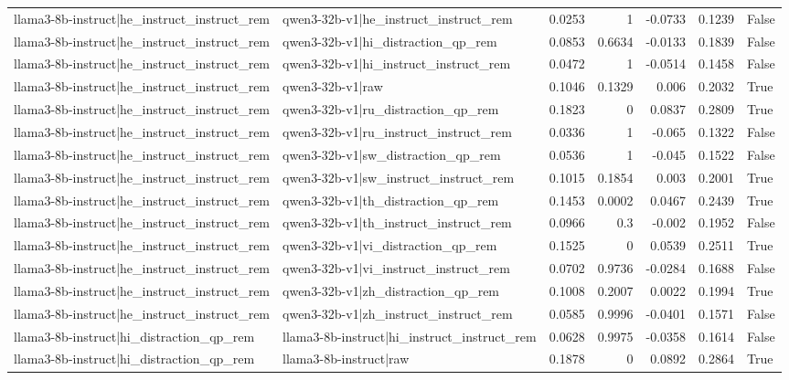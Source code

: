 \begin{table}
\begin{tabular}{l l r r r r l}
llama3-8b-instruct|he_instruct_instruct_rem & qwen3-32b-v1|he_instruct_instruct_rem & 0.0253 & 1 & -0.0733 & 0.1239 & False \\
llama3-8b-instruct|he_instruct_instruct_rem & qwen3-32b-v1|hi_distraction_qp_rem & 0.0853 & 0.6634 & -0.0133 & 0.1839 & False \\
llama3-8b-instruct|he_instruct_instruct_rem & qwen3-32b-v1|hi_instruct_instruct_rem & 0.0472 & 1 & -0.0514 & 0.1458 & False \\
llama3-8b-instruct|he_instruct_instruct_rem & qwen3-32b-v1|raw & 0.1046 & 0.1329 & 0.006 & 0.2032 & True \\
llama3-8b-instruct|he_instruct_instruct_rem & qwen3-32b-v1|ru_distraction_qp_rem & 0.1823 & 0 & 0.0837 & 0.2809 & True \\
llama3-8b-instruct|he_instruct_instruct_rem & qwen3-32b-v1|ru_instruct_instruct_rem & 0.0336 & 1 & -0.065 & 0.1322 & False \\
llama3-8b-instruct|he_instruct_instruct_rem & qwen3-32b-v1|sw_distraction_qp_rem & 0.0536 & 1 & -0.045 & 0.1522 & False \\
llama3-8b-instruct|he_instruct_instruct_rem & qwen3-32b-v1|sw_instruct_instruct_rem & 0.1015 & 0.1854 & 0.003 & 0.2001 & True \\
llama3-8b-instruct|he_instruct_instruct_rem & qwen3-32b-v1|th_distraction_qp_rem & 0.1453 & 0.0002 & 0.0467 & 0.2439 & True \\
llama3-8b-instruct|he_instruct_instruct_rem & qwen3-32b-v1|th_instruct_instruct_rem & 0.0966 & 0.3 & -0.002 & 0.1952 & False \\
llama3-8b-instruct|he_instruct_instruct_rem & qwen3-32b-v1|vi_distraction_qp_rem & 0.1525 & 0 & 0.0539 & 0.2511 & True \\
llama3-8b-instruct|he_instruct_instruct_rem & qwen3-32b-v1|vi_instruct_instruct_rem & 0.0702 & 0.9736 & -0.0284 & 0.1688 & False \\
llama3-8b-instruct|he_instruct_instruct_rem & qwen3-32b-v1|zh_distraction_qp_rem & 0.1008 & 0.2007 & 0.0022 & 0.1994 & True \\
llama3-8b-instruct|he_instruct_instruct_rem & qwen3-32b-v1|zh_instruct_instruct_rem & 0.0585 & 0.9996 & -0.0401 & 0.1571 & False \\
llama3-8b-instruct|hi_distraction_qp_rem & llama3-8b-instruct|hi_instruct_instruct_rem & 0.0628 & 0.9975 & -0.0358 & 0.1614 & False \\
llama3-8b-instruct|hi_distraction_qp_rem & llama3-8b-instruct|raw & 0.1878 & 0 & 0.0892 & 0.2864 & True \\

\end{tabular}
\end{table}
